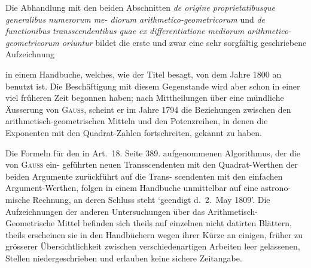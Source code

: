 \documentclass[12pt,a4paper]{article}
\begin{document}
Die Abhandlung mit den beiden Abschnitten \textit{de origine proprietatibusque generalibus numerorum me-\linebreak
\hspace*{\fill} diorum arithmetico-geometricorum} und \textit{de functionibus transscendentibus quae ex differentiatione mediorum\linebreak
\hspace*{\fill} arithmetico-geometricorum oriuntur} bildet die erste und zwar eine sehr sorgf\"altig geschriebene Aufzeichnung

\newpage
\noindent in einem Handbuche, welches, wie der Titel besagt, von dem Jahre 1800 an benutzt ist. Die Besch\"aftigung
mit diesem Gegenstande wird aber schon in einer viel fr\"uheren Zeit begonnen haben; nach Mittheilungen
\"uber eine m\"undliche \"Ausserung von \textsc{Gau\ss}, scheint er im Jahre 1794 die Beziehungen zwischen den arithmetisch-geometrischen Mitteln und den Potenzreihen, in denen die Exponenten mit den Quadrat-Zahlen fortschreiten, gekannt zu haben.

Die Formeln f\"ur den in Art.~18. Seite 389. aufgenommenen Algorithmus, der die von \textsc{Gau\ss} ein-\linebreak
\hspace*{\fill} gef\"uhrten neuen Transscendenten mit den Quadrat-Werthen der beiden Argumente zur\"uckf\"uhrt auf die Trans-\linebreak
\hspace*{\fill} scendenten mit den einfachen Argument-Werthen, folgen in einem Handbuche unmittelbar auf eine astrono-\linebreak
\hspace*{\fill} mische Rechnung, an deren Schluss steht `geendigt d.\ 2.\ May 1809'. Die Aufzeichnungen der anderen Untersuchungen \"uber das Arithmetisch-Geometrische Mittel befinden sich theils auf einzelnen nicht datirten
Bl\"attern, theils erscheinen sie in den Handb\"uchern wegen ihrer K\"urze an einigen, fr\"uher zu gr\"osserer \"Ubersichtlichkeit zwischen verschiedenartigen Arbeiten leer gelassenen, Stellen niedergeschrieben und erlauben
keine sichere Zeitangabe.
\end{document}
